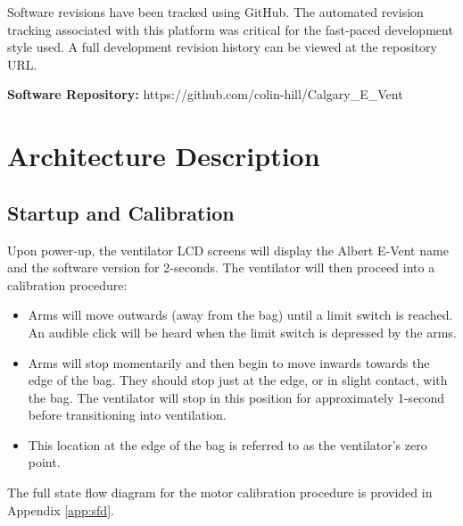 \documentclass[]{article}
\begin{document}
Software revisions have been tracked using GitHub.  The automated revision tracking associated with this platform was critical for the fast-paced development style used.  A full development revision history can be viewed at the repository URL.
\bigskip

\noindent \textbf{Software Repository:} https://github.com/colin-hill/Calgary\_E\_Vent




\clearpage
\section{Architecture Description}
\label{sect:architecture}



\subsection{Startup and Calibration}
\label{sect:startup_and_cal}

Upon power-up, the ventilator LCD screens will display the Albert E-Vent name and the software version for 2-seconds.  The ventilator will then proceed into a calibration procedure:
\begin{itemize}
	\item Arms will move outwards (away from the bag) until a limit switch is reached.  An audible click will be heard when the limit switch is depressed by the arms.
	\item Arms will stop momentarily and then begin to move inwards towards the edge of the bag.  They should stop just at the edge, or in slight contact, with the bag.  The ventilator will stop in this position for approximately 1-second before transitioning into ventilation.
	\item This location at the edge of the bag is referred to as the ventilator's zero point.
\end{itemize}
The full state flow diagram for the motor calibration procedure is provided in Appendix \ref{app:sfd}.
\end{document}
